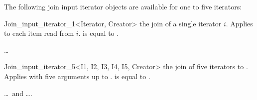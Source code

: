 \ccCreation

The following join input iterator objects are available for one to
five iterators:


\ccHtmlNoClassFile
\begin{ccClassTemplate}{Join_input_iterator_1<Iterator, Creator>}
    {the join of a single iterator $i$. Applies  to
      each item read from $i$.
       is equal to .}
\end{ccClassTemplate}

\ldots

\ccHtmlNoClassFile
\begin{ccClassTemplate}{Join_input_iterator_5<I1, I2, I3, I4, I5, Creator>}
    {the join of five iterators  to . Applies
       with five arguments  up to .
       is equal to .}
\end{ccClassTemplate}

\ccSeeAlso

 \ldots\ and  \ldots.


